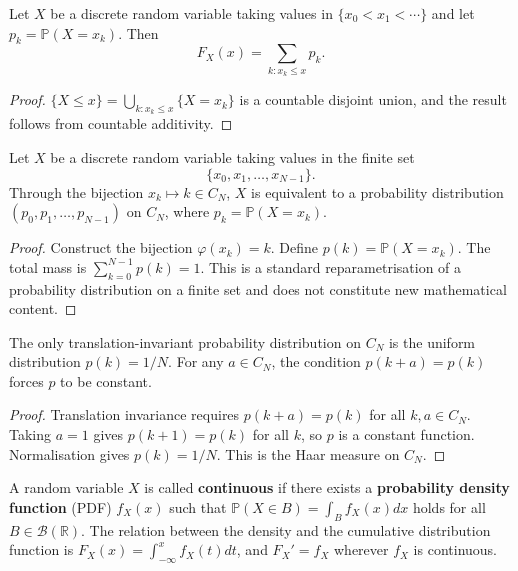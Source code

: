 \begin{proposition}\label{prop:pmf_cdf_relation}
Let $X$ be a discrete random variable taking values in $\{x_0 < x_1 < \cdots\}$ and let $p_k = \mathbb{P}(X = x_k)$. Then
\[
F_X(x) = \sum_{k : x_k \le x} p_k.
\]
\end{proposition}

\begin{proof}
$\{X \le x\} = \bigcup_{k: x_k \le x} \{X = x_k\}$ is a countable disjoint union, and the result follows from countable additivity.
\end{proof}

\begin{proposition}
\label{prop:discrete_cyclic}
Let $X$ be a discrete random variable taking values in the finite set
\[
\{x_0, x_1, \dots, x_{N-1}\}.
\]
Through the bijection $x_k \mapsto k \in C_N$,
$X$ is equivalent to a probability distribution $(p_0, p_1, \dots, p_{N-1})$ on $C_N$,
where $p_k = \mathbb{P}(X = x_k)$.
\end{proposition}
\begin{proof}
Construct the bijection $\varphi(x_k) = k$. Define $p(k) = \mathbb{P}(X = x_k)$. The total mass is $\sum_{k=0}^{N-1} p(k) = 1$. This is a standard reparametrisation of a probability distribution on a finite set and does not constitute new mathematical content.
\end{proof}

\begin{proposition}\label{prop:cyclic_uniform}
The only translation-invariant probability distribution on $C_N$ is the uniform distribution $p(k) = 1/N$. For any $a \in C_N$, the condition $p(k+a) = p(k)$ forces $p$ to be constant.
\end{proposition}

\begin{proof}
Translation invariance requires $p(k+a) = p(k)$ for all $k, a \in C_N$. Taking $a=1$ gives $p(k+1) = p(k)$ for all $k$, so $p$ is a constant function. Normalisation gives $p(k) = 1/N$. This is the Haar measure on $C_N$.
\end{proof}

\begin{definition}\label{def:continuous_distribution}
A random variable $X$ is called \textbf{continuous} if there exists a \textbf{probability density function} (PDF) $f_X(x)$ such that $\mathbb{P}(X \in B) = \int_B f_X(x) dx$ holds for all $B \in \mathcal{B}(\mathbb{R})$. The relation between the density and the cumulative distribution function is $F_X(x) = \int_{-\infty}^{x} f_X(t) dt$, and $F_X' = f_X$ wherever $f_X$ is continuous.
\end{definition}

